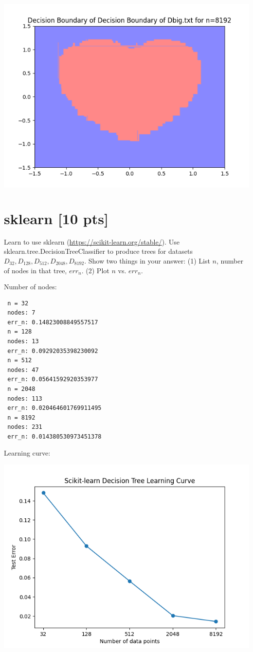 \documentclass[a4paper]{article}
\theoremstyle{definition}
\newenvironment{soln}{
    \leavevmode\color{blue}\ignorespaces
}{}
\begin{document}
\begin{enumerate}
\begin{soln}
\begin{center}
            \includegraphics[width=0.6\linewidth]{DbigRegion8192.png}
          \end{center}
        \end{soln}

\end{enumerate}

\section{sklearn [10 pts]}
Learn to use sklearn (\url{https://scikit-learn.org/stable/}).
Use sklearn.tree.DecisionTreeClassifier to produce trees for datasets $D_{32}, D_{128}, D_{512}, D_{2048}, D_{8192}$.  Show two things in your answer: (1) List $n$, number of nodes in that tree, $err_n$. (2) Plot $n$ vs. $err_n$.

\begin{soln}
  Number of nodes:
\begin{verbatim}
 n = 32
 nodes: 7
 err_n: 0.14823008849557517
 n = 128
 nodes: 13
 err_n: 0.09292035398230092
 n = 512
 nodes: 47
 err_n: 0.05641592920353977
 n = 2048
 nodes: 113
 err_n: 0.020464601769911495
 n = 8192
 nodes: 231
 err_n: 0.014380530973451378
\end{verbatim}

  Learning curve:

  \begin{center}
    \includegraphics[width=0.6\linewidth]{SKLearnError.png}
  \end{center}

\end{soln}
\end{document}

